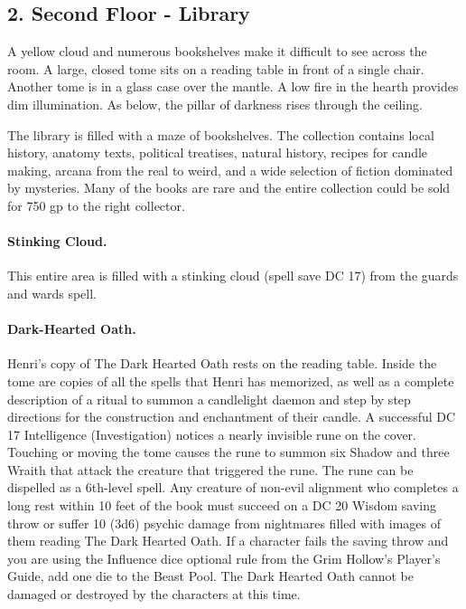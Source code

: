 \documentclass[10pt,a4paper,twoside,twocolumn,openany,bg=print,nodeprecatedcode]{dndbook}
\begin{document}
\subsection{2. Second Floor - Library}
\begin{DndReadAloud}{}
A yellow cloud and numerous bookshelves make it difficult to see across the room. A large, closed tome sits on a reading table in front of a single chair. Another tome is in a glass case over the mantle. A low fire in the hearth provides dim illumination. As below, the pillar of darkness rises through the ceiling.
\end{DndReadAloud}

The library is filled with a maze of bookshelves. The collection contains local history, anatomy texts, political treatises, natural history, recipes for candle making, arcana from the real to weird, and a wide selection of fiction dominated by mysteries. Many of the books are rare and the entire collection could be sold for 750 gp to the right collector.
\paragraph{Stinking Cloud.}
This entire area is filled with a stinking cloud (spell save DC 17) from the guards and wards spell.
\paragraph{Dark-Hearted Oath.}
Henri's copy of The Dark Hearted Oath rests on the reading table. Inside the tome are copies of all the spells that Henri has memorized, as well as a complete description of a ritual to summon a candlelight daemon and step by step directions for the construction and enchantment of their candle. A successful DC 17 Intelligence (Investigation) notices a nearly invisible rune on the cover. Touching or moving the tome causes the rune to summon six Shadow and three Wraith that attack the creature that triggered the rune. The rune can be dispelled as a 6th-level spell. Any creature of non-evil alignment who completes a long rest within 10 feet of the book must succeed on a DC 20 Wisdom saving throw or suffer 10 (3d6) psychic damage from nightmares filled with images of them reading The Dark Hearted Oath. If a character fails the saving throw and you are using the Influence dice optional rule from the Grim Hollow's Player's Guide, add one die to the Beast Pool.
The Dark Hearted Oath cannot be damaged or destroyed by the characters at this time.
\end{document}
